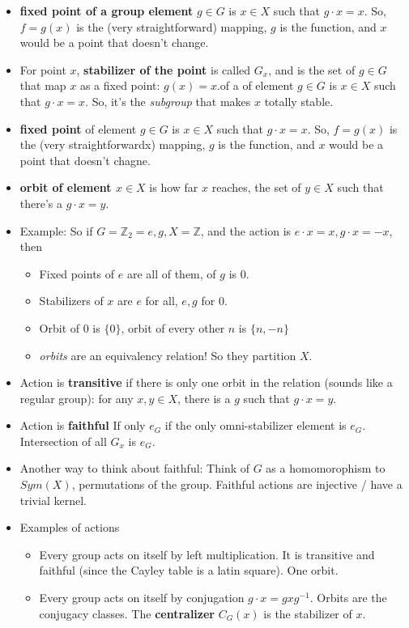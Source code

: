 \documentclass[11pt, oneside]{article}   	%
\begin{document}
\begin{itemize}
\item \textbf{fixed point of a group element} $g \in G$ is $x \in X$ such that $g \cdot x = x$.  So, $f = g(x)$ is the (very straightforward) mapping, $g$ is the function, and $x$ would be a point that doesn't change.
\item For point $x$, \textbf{stabilizer of the point} is called $G_x$, and is the set of $g \in G$ that map $x$ as a fixed point: $g(x) = x$.of a of element $g \in G$ is $x \in X$ such that $g \cdot x = x$.  So, it's the \emph{subgroup} that makes $x$ totally stable.
\item \textbf{fixed point} of element $g \in G$ is $x \in X$ such that $g \cdot x = x$.  So, $f = g(x)$ is the (very straightforwardx) mapping, $g$ is the function, and $x$ would be a point that doesn't chagne.
\item \textbf{orbit of element $x \in X$} is how far $x$ reaches, the set of $y \in X$ such that there's a $g \cdot x = y$.
\item Example: So if $G = \mathbb{Z}_2 = {e, g}, X = \mathbb{Z}$, and the action is $e \cdot x = x, g \cdot x = -x$, then
  \begin{itemize}
  \item Fixed points of $e$ are all of them, of $g$ is 0.
  \item Stabilizers of $x$ are $e$ for all, $e,g$ for 0.
  \item Orbit of 0 is $\{0\}$, orbit of every other $n$ is $\{n, -n\}$
  \item \emph{orbits} are an equivalency relation!  So they partition $X$.
  \end{itemize}
 \item Action is \textbf{transitive} if there is only one orbit in the relation (sounds like a regular group): for any $x, y \in X$, there is a $g$ such that $g \cdot x = y$.
 \item Action is \textbf{faithful} If only $e_G$ if the only omni-stabilizer element is $e_G$.  Intersection of all $G_x$ is $e_G$.
 \item Another way to think about faithful: Think of $G$ as a homomorophism to $Sym(X)$, permutations of the group.  Faithful actions are injective / have a trivial kernel.
\item Examples of actions 
  \begin {itemize}
  \item Every group acts on itself by left multiplication.  It is transitive and faithful (since the Cayley table is a latin square).  One orbit.
  \item Every group acts on itself by conjugation $g \cdot x = g x g^{-1}$. Orbits are the conjugacy classes.  The \textbf{centralizer} $C_G(x)$ is the stabilizer of $x$.

\end{itemize}
\end{itemize}
\end{document}
